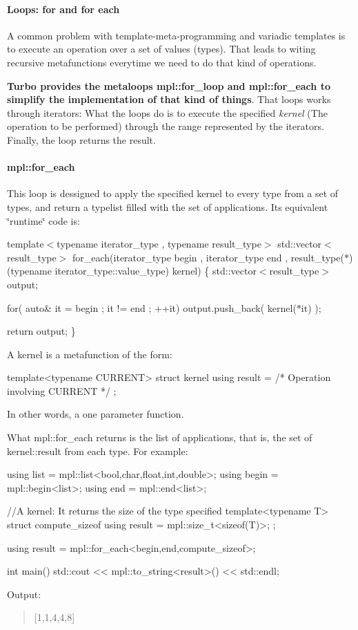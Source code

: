 \paragraph*{Loops\+: for and for each}

A common problem with template-\/meta-\/programming and variadic templates is to execute an operation over a set of values (types). That leads to witing recursive metafunctions everytime we need to do that kind of operations.

{\bfseries Turbo provides the metaloops {\ttfamily mpl\+::for\+\_\+loop} and {\ttfamily mpl\+::for\+\_\+each} to simplify the implementation of that kind of things}. That loops works through iterators\+: What the loops do is to execute the specified {\itshape kernel} (The operation to be performed) through the range represented by the iterators. Finally, the loop returns the result.

\paragraph*{{\ttfamily mpl\+::for\+\_\+each}}

This loop is dessigned to apply the specified kernel to every type from a set of types, and return a typelist filled with the set of applications. Its equivalent \char`\"{}runtime\char`\"{} code is\+:

template$<$typename iterator\+\_\+type , typename result\+\_\+type$>$ std\+::vector$<$result\+\_\+type$>$ for\+\_\+each(iterator\+\_\+type begin , iterator\+\_\+type end , result\+\_\+type($\ast$)(typename iterator\+\_\+type\+::value\+\_\+type) kernel) \{ std\+::vector$<$result\+\_\+type$>$ output;

for( auto\& it = begin ; it != end ; ++it) output.\+push\+\_\+back( kernel($\ast$it) );

return output; \}

A kernel is a metafunction of the form\+: \begin{DoxyVerb} template<typename CURRENT>
 struct kernel
 {
  using result = /* Operation involving CURRENT */
 };
\end{DoxyVerb}
 In other words, a one parameter function.

What {\ttfamily mpl\+::for\+\_\+each} returns is the list of applications, that is, the set of {\ttfamily kernel\+::result} from each type. For example\+: \begin{DoxyVerb}using list = mpl::list<bool,char,float,int,double>;
using begin = mpl::begin<list>;
using end = mpl::end<list>;

//A kernel: It returns the size of the type specified
template<typename T>
struct compute_sizeof
{
  using result = mpl::size_t<sizeof(T)>;
};

using result = mpl::for_each<begin,end,compute_sizeof>;

int main()
{
  std::cout << mpl::to_string<result>() << std::endl;
}
\end{DoxyVerb}
 Output\+: \begin{quote}
\mbox{[}1,1,4,4,8\mbox{]} \end{quote}



